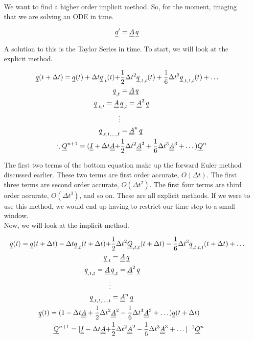 
We want to find a higher order implicit method. So, for the moment, imaging that we are solving an ODE in time. 

\begin{align*}
{\underline{q}}' = {\underline{\underline{A}}}\,{\underline{q}}
\end{align*}

A solution to this is the Taylor Series in time. To start, we will look at the explicit method.


\begin{align*}
{\underline{q}}(t + \Delta t) = {\underline{q}}(t) + \Delta t {\underline{q}}_{,t}(t) + &\frac{1}{2}\Delta t^2 {\underline{q}}_{,t,t}(t) + \frac{1}{6}\Delta t^3 {\underline{q}}_{,t,t,t}(t) + \dots \\
{\underline{q}}_{,t} &= {\underline{\underline{A}}}\,{\underline{q}}  \\
{\underline{q}}_{,t,t} = {\underline{\underline{A}}}\,&{\underline{q}}_{,t} = {\underline{\underline{A}}}^2\,{\underline{q}} \\
\vdots& \\
{\underline{q}}_{,t,t,...,t} &= {\underline{\underline{A}}}^n\,{\underline{q}}  \\
\therefore {\underline{Q}}^{n+1} = ({\underline{\underline{I}}} + \Delta t {\underline{\underline{A}}} + &\frac{1}{2} \Delta t^2{\underline{\underline{A}}}^2 + \frac{1}{6}\Delta t^3 {\underline{\underline{A}}}^3 + \dots){\underline{Q}}^n
\end{align*}

The first two terms of the bottom equation make up the forward Euler method discussed earlier. These two terms are first order accurate, $O(\Delta t)$. The first three terms are second order accurate, $O(\Delta t^2)$. The first four terms are third order accurate, $O(\Delta t^3)$, and so on. These are all explicit methods. If we were to use this method, we would end up having to restrict our time step to a small window.  \\

Now, we will look at the implicit method.

\begin{align*}
{\underline{q}}(t) = {\underline{q}}(t + \Delta t) - \Delta t {\underline{q}}_{,t}(t + \Delta t) + &\frac{1}{2} \Delta t^2 {\underline{Q}}_{,t,t}(t + \Delta t) - \frac{1}{6} \Delta t^3 {\underline{q}}_{,t,t,t}(t + \Delta t) + \dots \\
{\underline{q}}_{,t} &= {\underline{\underline{A}}}\,{\underline{q}} \\
{\underline{q}}_{,t,t} = {\underline{\underline{A}}}\,&{\underline{q}}_{,t} = {\underline{\underline{A}}}^2\,{\underline{q}} \\
\vdots& \\
{\underline{q}}_{,t,t,...,t} &= {\underline{\underline{A}}}^n\,{\underline{q}} \\
{\underline{q}}(t) = (1 - \Delta t {\underline{\underline{A}}} + \frac{1}{2} \Delta t^2& {\underline{\underline{A}}}^2 - \frac{1}{6} \Delta t^3 {\underline{\underline{A}}}^3 + \dots) {\underline{q}}(t + \Delta t) \\
{\underline{Q}}^{n+1} = [{\underline{\underline{I}}} - \Delta t {\underline{\underline{A}}} + &\frac{1}{2} \Delta t^2 {\underline{\underline{A}}}^2 - \frac{1}{6} \Delta t^3 {\underline{\underline{A}}}^3 + \dots]^{-1} {\underline{Q}}^n
\end{align*}

